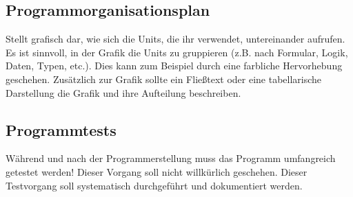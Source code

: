 \documentclass[12pt, letterpaper]{article}
\begin{document}
        \subsection{Programmorganisationsplan}
            Stellt grafisch dar, wie sich die Units, die ihr verwendet, untereinander aufrufen. Es ist sinnvoll, in der Grafik die Units zu gruppieren (z.B. nach Formular, Logik, Daten, Typen, etc.). Dies kann zum Beispiel durch eine farbliche Hervorhebung geschehen. Zusätzlich zur Grafik sollte ein Fließtext oder eine tabellarische Darstellung die Grafik und ihre Aufteilung beschreiben.
            
        \subsection{Programmtests}
            Während und nach der Programmerstellung muss das Programm umfangreich getestet werden! Dieser Vorgang soll nicht willkürlich geschehen. Dieser Testvorgang soll systematisch durchgeführt und dokumentiert werden.
\end{document}
